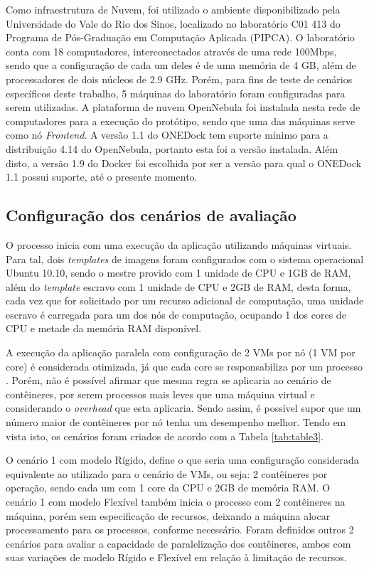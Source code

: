 \documentclass[twoside,english,brazilian]{UNISINOSartigo}
\begin{document}
Como infraestrutura de Nuvem, foi utilizado o ambiente disponibilizado pela Universidade do Vale do Rio dos Sinos, localizado no laboratório C01 413 do Programa de Pós-Graduação em Computação Aplicada (PIPCA). O laboratório conta com 18 computadores, interconectados através de uma rede 100Mbps, sendo que a configuração de cada um deles é de uma memória de 4 GB, além de processadores de dois núcleos de 2.9 GHz. Porém, para fins de teste de cenários específicos deste trabalho, 5 máquinas do laboratório foram configuradas para serem utilizadas. A plataforma de nuvem OpenNebula foi instalada nesta rede de computadores para a execução do protótipo, sendo que uma das máquinas serve como nó \textit{Frontend}. 
A versão 1.1 do ONEDock tem suporte mínimo para a distribuição 4.14 do OpenNebula, portanto esta foi a versão instalada. Além disto, a versão 1.9 do Docker foi escolhida por ser a versão para qual o ONEDock 1.1 possui suporte, até o presente momento. 

\subsection{Configuração dos cenários de avaliação}

O processo inicia com uma execução da aplicação utilizando máquinas virtuais. Para tal, dois \textit{templates} de imagens foram configurados com o sistema operacional Ubuntu 10.10, sendo o mestre provido com 1 unidade de CPU e 1GB de RAM, além do \textit{template} escravo com 1 unidade de CPU e 2GB de RAM, desta forma, cada vez que for solicitado por um recurso adicional de computação, uma unidade escravo é carregada para um dos nós de computação, ocupando 1 dos cores de CPU e metade da memória RAM disponível.

A execução da aplicação paralela com configuração de 2 VMs por nó (1 VM por core) é considerada otimizada, já que cada core se responsabiliza por um processo \cite{7090978}. Porém, não é possível afirmar que mesma regra se aplicaria ao cenário de contêineres, por serem processos mais leves que uma máquina virtual e considerando o \textit{overhead} que esta aplicaria. Sendo assim, é possível supor que um número maior de contêineres por nó tenha um desempenho melhor. Tendo em vista isto, os cenários foram criados de acordo com a Tabela \ref{tab:table3}.

O cenário 1 com modelo Rígido, define o que seria uma configuração considerada equivalente ao utilizado para o cenário de VMs, ou seja: 2 contêineres por operação, sendo cada um com 1 core da CPU e 2GB de memória RAM. O cenário 1 com modelo Flexível também inicia o processo com 2 contêineres na máquina, porém sem especificação de recursos, deixando a máquina alocar processamento para os processos, conforme necessário. Foram definidos outros 2 cenários para avaliar a capacidade de paralelização dos contêineres, ambos com suas variações de modelo Rígido e Flexível em relação à limitação de recursos.
\end{document}
